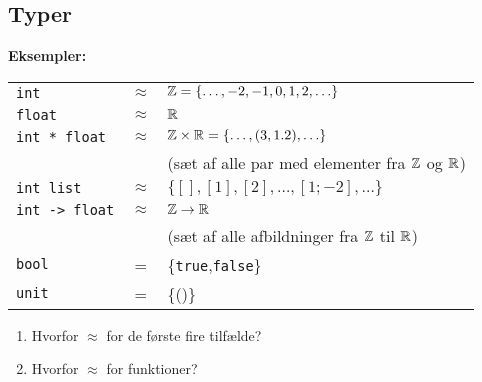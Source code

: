 \documentclass[rgb]{beamer}
\begin{document}
\subsection{Typer}
\begin{frame}[fragile]
\begin{footnotesize}


  \vspace{1ex}

  \textbf{Eksempler:}

  \vspace{1ex}

  \begin{tabular}{lcl}
    \texttt{int} & $\approx$ & $\mathbb{Z} = \{\ldots,-2,-1,0,1,2,\ldots\}$ \\[1ex]
    \texttt{float} & $\approx$ & $\mathbb{R}$ \\[1ex]
    \texttt{int * float} & $\approx$ & $\mathbb{Z} \times \mathbb{R} = \{\ldots,(3,1.2),\ldots\}$ \\
    & & (sæt af alle par med elementer fra $\mathbb{Z}$ og $\mathbb{R}$) \\[1ex]
    \texttt{int list} & $\approx$ & $\{[],[1],[2],\ldots,[1;-2],\ldots\}$ \\[1ex]
    \texttt{int -> float} & $\approx$ & $\mathbb{Z} \rightarrow \mathbb{R}$ \\ & & (sæt af alle afbildninger fra $\mathbb{Z}$ til $\mathbb{R}$) \\[1ex]
    \texttt{bool} & = & \{\texttt{true},\texttt{false}\} \\[1ex]
    \texttt{unit} & = & \{()\}
  \end{tabular}
\end{footnotesize}

\begin{enumerate}
\item Hvorfor $\approx$ for de første fire tilfælde?
\item Hvorfor $\approx$ for funktioner?
\end{enumerate}
\end{frame}
\end{document}
